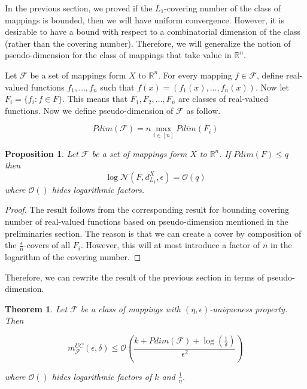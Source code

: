 \documentclass[letterpaper,12pt,titlepage,oneside,final]{book}
\newtheorem{theorem}{Theorem}
\newtheorem{proposition}{Proposition}
\begin{document}
In the previous section, we proved if the $L_1$-covering number of the class of mappings is bounded, then we will have uniform convergence. However, it is desirable to have a bound with respect to a combinatorial dimension of the class (rather than the covering number). Therefore, we will generalize the notion of pseudo-dimension for the class of mappings that take value in $\mathbb{R}^n$.

Let $\mathcal{F}$ be a set of mappings form $X$ to $\mathbb{R}^n$. For every mapping $f\in \mathcal{F}$, define real-valued functions $f_1,\ldots,f_n$ such that $f(x)= (f_1(x),\ldots,f_n(x))$. Now let $F_i = \{ f_i: f\in F\}$. This means that $F_1, F_2,\ldots,F_n$ are classes of real-valued functions. Now we define pseudo-dimension of $\mathcal{F}$ as follow.

\begin{equation}
Pdim(\mathcal{F}) = n \max_{i\in[n]} Pdim(F_i)
\end{equation}

\begin{proposition} Let $\mathcal{F}$ be a set of mappings form $X$ to $\mathbb{R}^n$. If $Pdim(F)\leq q$ then $$\log \mathcal{N}(F, d_{L_1}^X,\epsilon) = \mathcal{O}(q)$$ where $\mathcal{O}()$ hides logarithmic factors.

\end{proposition}

\begin{proof} The result follows from the corresponding result for bounding covering number of real-valued functions based on pseudo-dimension mentioned in the preliminaries section. The reason is that we can create a cover by composition of the $\frac{\epsilon}{n}$-covers of all $F_i$. However, this will at most introduce a factor of $n$ in the logarithm of the covering number.
\end{proof}


Therefore, we can rewrite the result of the previous section in terms of pseudo-dimension.

\begin{theorem} 
\label{UCSAMPLET}
Let $\mathcal{F}$ be a class of mappings with $(\eta, \epsilon)$-uniqueness property. Then 

\begin{equation}
m^{UC}_{\mathcal{F}}(\epsilon, \delta) \leq \mathcal{O}(\frac{ k + Pdim(\mathcal{F})+\log(\frac{1}{\delta})}{\epsilon^2})
\end{equation}

where $\mathcal{O}()$ hides logarithmic factors of $k$ and $\frac{1}{\eta}$.


\end{theorem}
\end{document}
